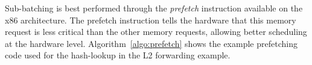 

Sub-batching is best performed through the {\em prefetch} instruction available
on the x86 architecture. The prefetch instruction tells the hardware that this memory request is less
critical than the other memory requests, allowing better scheduling at the hardware level. Algorithm~\ref{algo:prefetch}
shows the example prefetching code used for the hash-lookup in the L2 forwarding example.

